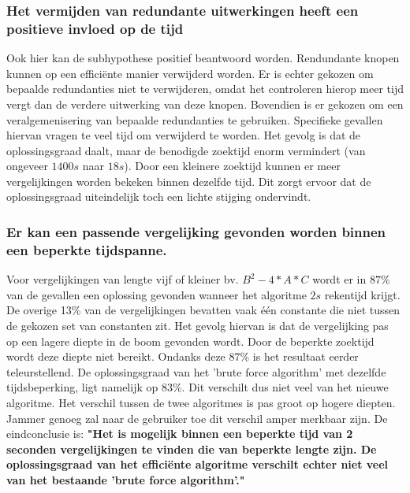 \documentclass[Main.tex]{subfiles}
\begin{document}
\subsubsection{Het vermijden van redundante uitwerkingen heeft een positieve invloed op de tijd}
Ook hier kan de subhypothese positief beantwoord worden. Rendundante knopen kunnen op een effici\"ente manier verwijderd worden. Er is echter gekozen om bepaalde redundanties niet te verwijderen, omdat het controleren hierop meer tijd vergt dan de verdere uitwerking van deze knopen. Bovendien is er gekozen om een veralgemenisering van bepaalde redundanties te gebruiken. Specifieke gevallen hiervan vragen te veel tijd om verwijderd te worden. Het gevolg is dat de oplossingsgraad daalt, maar de benodigde zoektijd enorm vermindert (van ongeveer $1400s$ naar $18s$). Door een kleinere zoektijd kunnen er meer vergelijkingen worden bekeken binnen dezelfde tijd. Dit zorgt ervoor dat de oplossingsgraad uiteindelijk toch een lichte stijging ondervindt.

\subsubsection{Er kan een passende vergelijking gevonden worden binnen een beperkte tijdspanne.}
Voor vergelijkingen van lengte vijf of kleiner bv. $B^{2} - 4 \ast A \ast C$ wordt er in $87\%$ van de gevallen een oplossing gevonden wanneer het algoritme $2s$ rekentijd krijgt. De overige 13\% van de vergelijkingen bevatten vaak \'e\'en constante die niet tussen de gekozen set van constanten zit. Het gevolg hiervan is dat de vergelijking pas op een lagere diepte in de boom gevonden wordt. Door de beperkte zoektijd wordt deze diepte niet bereikt. Ondanks deze $87\%$ is het resultaat eerder teleurstellend. De oplossingsgraad van het 'brute force algorithm' met dezelfde tijdsbeperking, ligt namelijk op $83\%$. Dit verschilt dus niet veel van het nieuwe algoritme. Het verschil tussen de twee algoritmes is pas groot op hogere diepten. Jammer genoeg zal naar de gebruiker toe dit verschil amper merkbaar zijn. De eindconclusie is: \textbf{"Het is mogelijk binnen een beperkte tijd van 2 seconden vergelijkingen te vinden die van beperkte lengte zijn. De oplossingsgraad van het effici\"ente algoritme verschilt echter niet veel van het bestaande 'brute force algorithm'."}
\end{document}
